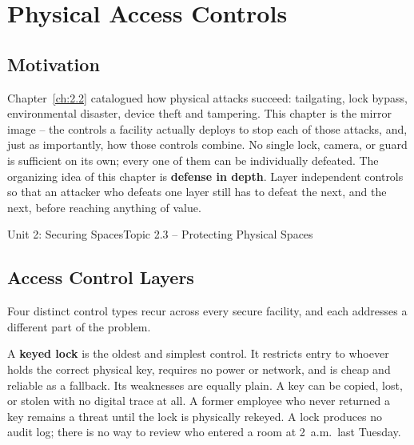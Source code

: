 \chapter{Physical Access Controls}
\label{ch:2.3}


\section{Motivation}

Chapter~\ref{ch:2.2} catalogued how physical attacks succeed: tailgating, lock bypass,
environmental disaster, device theft and tampering. This chapter is the mirror image -- the
controls a facility actually deploys to stop each of those attacks, and, just as importantly, how
those controls combine. No single lock, camera, or guard is sufficient on its own; every one of
them can be individually defeated. The organizing idea of this chapter is \textbf{defense in
depth}. Layer independent controls so that an attacker who defeats one layer still has to
defeat the next, and the next, before reaching anything of value.

\begin{apalignment}{Unit 2: Securing Spaces}{Topic 2.3 -- Protecting Physical Spaces}
\begin{apobjectives}
\end{apobjectives}
\end{apalignment}

\section{Access Control Layers}

Four distinct control types recur across every secure facility, and each addresses a different
part of the problem.

A \textbf{keyed lock} is the oldest and simplest control. It restricts entry to whoever holds the
correct physical key, requires no power or network, and is cheap and reliable as a fallback. Its
weaknesses are equally plain. A key can be copied, lost, or stolen with no digital trace at all.
A former employee who never returned a key remains a threat until the lock is physically
rekeyed. A lock produces no audit log; there is no way to review who entered a room at 2~a.m.\
last Tuesday.


